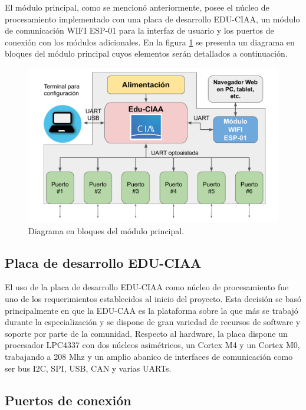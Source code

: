 El módulo principal, como se mencionó anteriormente, posee el núcleo de procesamiento implementado con una placa de desarrollo EDU-CIAA, un módulo de comunicación WIFI ESP-01 para la interfaz de usuario y los puertos de conexión con los módulos adicionales. En la figura \ref{fig:BloquesPrincipal} se presenta un diagrama en bloques del módulo principal cuyos elementos serán detallados a continuación.

\begin{figure}[H]
	\centering
	\includegraphics[width=1\textwidth]{./Figures/bloquesPrincipal.pdf}
	\caption{Diagrama en bloques del módulo principal.}
	\label{fig:BloquesPrincipal}
\end{figure}



\subsection{Placa de desarrollo EDU-CIAA}

El uso de la placa de desarrollo EDU-CIAA como núcleo de procesamiento fue uno de los requerimientos establecidos al inicio del proyecto. Esta decisión se basó principalmente en que la EDU-CAA es la plataforma sobre la que más se trabajó durante la especialización y se dispone de gran variedad de recursos de software y soporte por parte de la comunidad. 
Respecto al hardware, la placa dispone un procesador LPC4337 con dos núcleos asimétricos, un Cortex M4 y un Cortex M0, trabajando a 208 Mhz y un amplio abanico de interfaces de comunicación como ser bus I2C, SPI, USB, CAN y varias UARTs. 


\subsection{Puertos de conexión}
\label{sec:puertos}

